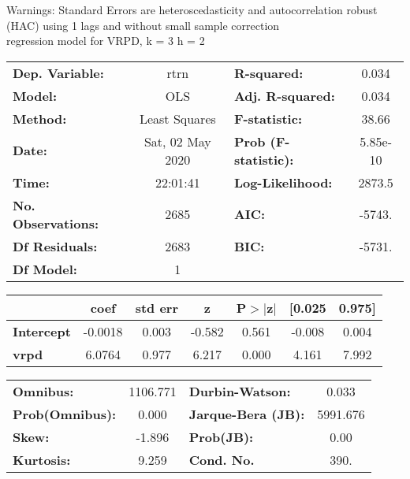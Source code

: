 Warnings: \newline
 [1] Standard Errors are heteroscedasticity and autocorrelation robust (HAC) using 1 lags and without small sample correction\\ 

regression model for VRPD, k = 3 h = 2\begin{center}
\begin{tabular}{lclc}
\toprule
\textbf{Dep. Variable:}    &       rtrn       & \textbf{  R-squared:         } &     0.034   \\
\textbf{Model:}            &       OLS        & \textbf{  Adj. R-squared:    } &     0.034   \\
\textbf{Method:}           &  Least Squares   & \textbf{  F-statistic:       } &     38.66   \\
\textbf{Date:}             & Sat, 02 May 2020 & \textbf{  Prob (F-statistic):} &  5.85e-10   \\
\textbf{Time:}             &     22:01:41     & \textbf{  Log-Likelihood:    } &    2873.5   \\
\textbf{No. Observations:} &        2685      & \textbf{  AIC:               } &    -5743.   \\
\textbf{Df Residuals:}     &        2683      & \textbf{  BIC:               } &    -5731.   \\
\textbf{Df Model:}         &           1      & \textbf{                     } &             \\
\bottomrule
\end{tabular}
\begin{tabular}{lcccccc}
                   & \textbf{coef} & \textbf{std err} & \textbf{z} & \textbf{P$> |$z$|$} & \textbf{[0.025} & \textbf{0.975]}  \\
\midrule
\textbf{Intercept} &      -0.0018  &        0.003     &    -0.582  &         0.561        &       -0.008    &        0.004     \\
\textbf{vrpd}      &       6.0764  &        0.977     &     6.217  &         0.000        &        4.161    &        7.992     \\
\bottomrule
\end{tabular}
\begin{tabular}{lclc}
\textbf{Omnibus:}       & 1106.771 & \textbf{  Durbin-Watson:     } &    0.033  \\
\textbf{Prob(Omnibus):} &   0.000  & \textbf{  Jarque-Bera (JB):  } & 5991.676  \\
\textbf{Skew:}          &  -1.896  & \textbf{  Prob(JB):          } &     0.00  \\
\textbf{Kurtosis:}      &   9.259  & \textbf{  Cond. No.          } &     390.  \\
\bottomrule
\end{tabular}
\end{center}

